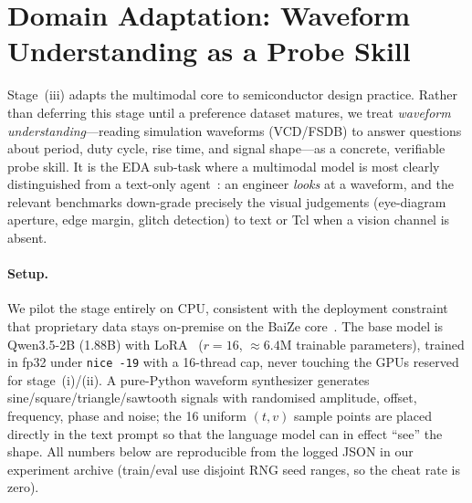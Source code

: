 ﻿\section{Domain Adaptation: Waveform Understanding as a Probe Skill}\label{sec:domain}

Stage~(iii) adapts the multimodal core to semiconductor design practice. Rather than deferring this stage until a preference dataset matures, we treat \emph{waveform understanding}---reading simulation waveforms (VCD/FSDB) to answer questions about period, duty cycle, rise time, and signal shape---as a concrete, verifiable probe skill. It is the EDA sub-task where a multimodal model is most clearly distinguished from a text-only agent~\cite{baiZe-llm}: an engineer \emph{looks} at a waveform, and the relevant benchmarks down-grade precisely the visual judgements (eye-diagram aperture, edge margin, glitch detection) to text or Tcl when a vision channel is absent.

\paragraph{Setup.}
We pilot the stage entirely on CPU, consistent with the deployment constraint that proprietary data stays on-premise on the BaiZe core~\cite{baiZe-llm}. The base model is Qwen3.5-2B (1.88B) with LoRA~\cite{hu2022lora} ($r{=}16$, ${\approx}6.4$M trainable parameters), trained in fp32 under \texttt{nice~-19} with a 16-thread cap, never touching the GPUs reserved for stage~(i)/(ii). A pure-Python waveform synthesizer generates sine/square/triangle/sawtooth signals with randomised amplitude, offset, frequency, phase and noise; the 16 uniform $(t,v)$ sample points are placed directly in the text prompt so that the language model can in effect ``see'' the shape. All numbers below are reproducible from the logged JSON in our experiment archive (train/eval use disjoint RNG seed ranges, so the cheat rate is zero).

